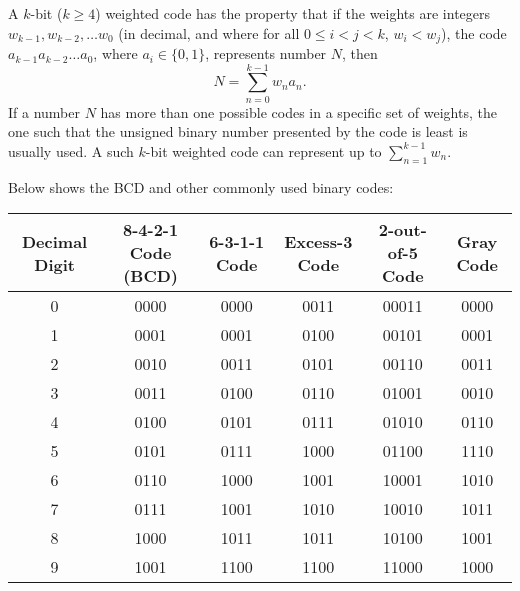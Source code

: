 \documentclass[a4paper,12pt]{report}
\begin{document}
A $k$-bit ($k\geq 4$) weighted code has the property that if the weights are integers $w_{k-1}, w_{k-2}, \ldots w_0$ (in decimal, and where for all $0\leq i<j<k$, $w_i<w_j$), the code $a_{k-1}a_{k-2}\ldots a_0$, where $a_i\in\{0,1\}$, represents number $N$, then
\[N = \sum_{n=0}^{k-1}w_na_n.\]
If a number $N$ has more than one possible codes in a specific set of weights, the one such that the unsigned binary number presented by the code is least is usually used. A such $k$-bit weighted code can represent up to $\sum_{n=1}^{k-1}w_n$.

Below shows the BCD and other commonly used binary codes:
\begin{longtable}[c]{|c|c|c|c|c|c|}
\hline
Decimal Digit & 8-4-2-1 Code (BCD) & 6-3-1-1 Code & Excess-3 Code & 2-out-of-5 Code & Gray Code\\\hline
0 & 0000 & 0000 & 0011 & 00011 & 0000\\\hline
1 & 0001 & 0001 & 0100 & 00101 & 0001\\\hline
2 & 0010 & 0011 & 0101 & 00110 & 0011\\\hline
3 & 0011 & 0100 & 0110 & 01001 & 0010\\\hline
4 & 0100 & 0101 & 0111 & 01010 & 0110\\\hline
5 & 0101 & 0111 & 1000 & 01100 & 1110\\\hline
6 & 0110 & 1000 & 1001 & 10001 & 1010\\\hline
7 & 0111 & 1001 & 1010 & 10010 & 1011\\\hline
8 & 1000 & 1011 & 1011 & 10100 & 1001\\\hline
9 & 1001 & 1100 & 1100 & 11000 & 1000\\\hline
\end{longtable}\FB
\end{document}
